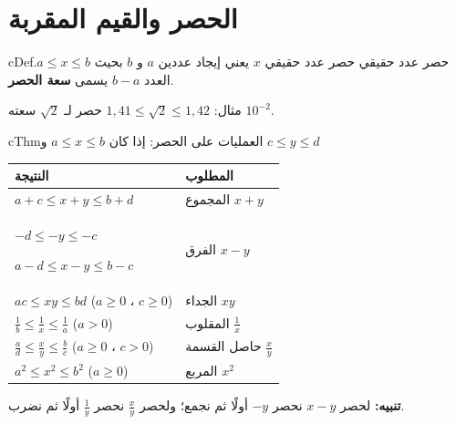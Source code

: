\documentclass[12pt,a4paper]{article}
\newenvironment{BOX}[2]{\begin{otherlanguage}{english}\begin{arbox}{#1}{#2}}{\end{arbox}\end{otherlanguage}}
\newenvironment{tarif}[1][تعريف]{\begin{BOX}{cDef}{#1}}{\end{BOX}}
\newenvironment{khassia}[1][خاصية]{\begin{BOX}{cThm}{#1}}{\end{BOX}}
\begin{document}
\section{الحصر والقيم المقربة}
\begin{tarif}[حصر عدد حقيقي]
حصر عدد حقيقي $x$ يعني إيجاد عددين $a$ و $b$ بحيث $a\leqslant x\leqslant b$. العدد $b-a$ يسمى \textbf{سعة الحصر}.\par
مثال: $1{,}41\leqslant\sqrt{2}\leqslant1{,}42$ حصر لـ $\sqrt{2}$ سعته $10^{-2}$.
\end{tarif}
\begin{khassia}[العمليات على الحصر: إذا كان $a\leqslant x\leqslant b$ و $c\leqslant y\leqslant d$]
\begin{center}
\renewcommand{\arraystretch}{1.7}
\begin{tabular}{|>{\centering\arraybackslash}p{}|>{\centering\arraybackslash}p{}|}\hline
\rowcolor{cSec!12}\textbf{النتيجة} & \textbf{المطلوب}\\\hline
$a+c\leqslant x+y\leqslant b+d$ & المجموع $x+y$\\\hline
$-d\leqslant-y\leqslant-c$ \par $a-d\leqslant x-y\leqslant b-c$ & الفرق $x-y$\\\hline
$ac\leqslant xy\leqslant bd$ \quad ($a\geqslant0$ ، $c\geqslant0$) & الجداء $xy$\\\hline
$\frac{1}{b}\leqslant\frac{1}{x}\leqslant\frac{1}{a}$ \quad ($a>0$) & المقلوب $\frac{1}{x}$\\\hline
$\frac{a}{d}\leqslant\frac{x}{y}\leqslant\frac{b}{c}$ \quad ($a\geqslant0$ ، $c>0$) & حاصل القسمة $\frac{x}{y}$\\\hline
$a^{2}\leqslant x^{2}\leqslant b^{2}$ \quad ($a\geqslant0$) & المربع $x^{2}$\\\hline
\end{tabular}
\end{center}
\textbf{تنبيه:} لحصر $x-y$ نحصر $-y$ أولًا ثم نجمع؛ ولحصر $\frac{x}{y}$ نحصر $\frac{1}{y}$ أولًا ثم نضرب.
\end{khassia}
\end{document}

